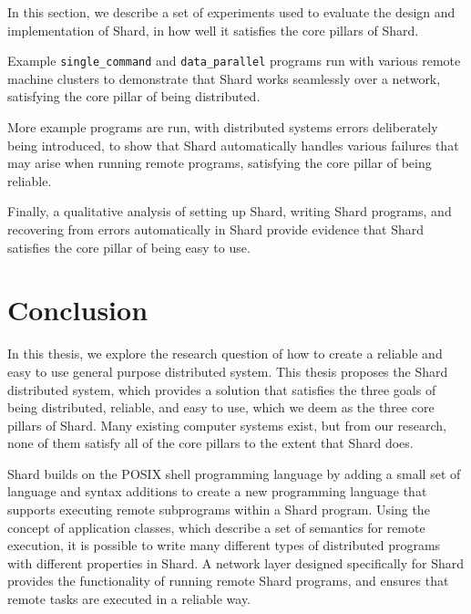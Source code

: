 \documentclass[twoside]{report}
\newcommand{\todoi}[1]{\todo[inline, color=blue!20]{TODO: {#1}}}
\begin{document}
In this section, we describe a set of experiments used to evaluate the design and implementation of Shard, in how well it satisfies the core pillars of Shard.

Example \texttt{single\_command} and \texttt{data\_parallel} programs run with various remote machine clusters to demonstrate that Shard works seamlessly over a network, satisfying the core pillar of being distributed.

More example programs are run, with distributed systems errors deliberately being introduced, to show that Shard automatically handles various failures that may arise when running remote programs, satisfying the core pillar of being reliable.

Finally, a qualitative analysis of setting up Shard, writing Shard programs, and recovering from errors automatically in Shard provide evidence that Shard satisfies the core pillar of being easy to use.

\chapter{Conclusion}


In this thesis, we explore the research question of how to create a reliable and easy to use general purpose distributed system.
This thesis proposes the Shard distributed system, which provides a solution that satisfies the three goals of being distributed, reliable, and easy to use, which we deem as the three core pillars of Shard.
Many existing computer systems exist, but from our research, none of them satisfy all of the core pillars to the extent that Shard does.

Shard builds on the POSIX shell programming language by adding a small set of language and syntax additions to create a new programming language that supports executing remote subprograms within a Shard program.
Using the concept of application classes, which describe a set of semantics for remote execution, it is possible to write many different types of distributed programs with different properties in Shard.
A network layer designed specifically for Shard provides the functionality of running remote Shard programs, and ensures that remote tasks are executed in a reliable way.
\end{document}

